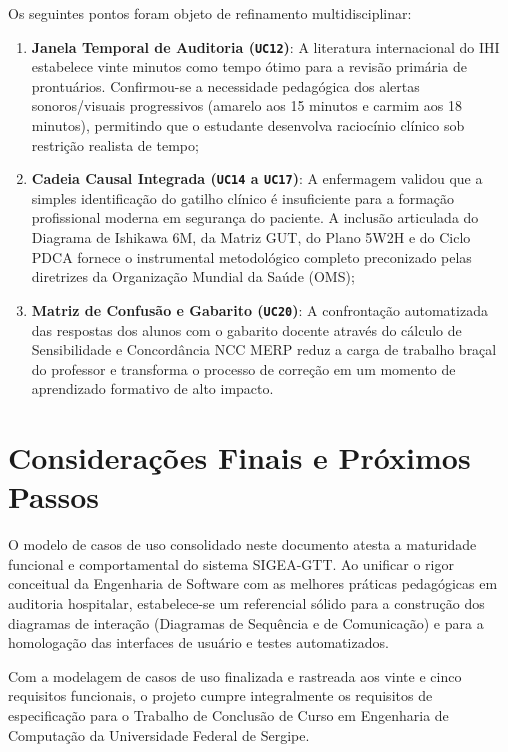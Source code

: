Os seguintes pontos foram objeto de refinamento multidisciplinar:
\begin{enumerate}
    \item \textbf{Janela Temporal de Auditoria (\texttt{UC12})}: A literatura internacional do IHI \cite{ihi2009} estabelece vinte minutos como tempo ótimo para a revisão primária de prontuários. Confirmou-se a necessidade pedagógica dos alertas sonoros/visuais progressivos (amarelo aos 15 minutos e carmim aos 18 minutos), permitindo que o estudante desenvolva raciocínio clínico sob restrição realista de tempo;
    \item \textbf{Cadeia Causal Integrada (\texttt{UC14} a \texttt{UC17})}: A enfermagem validou que a simples identificação do gatilho clínico é insuficiente para a formação profissional moderna em segurança do paciente. A inclusão articulada do Diagrama de Ishikawa 6M, da Matriz GUT, do Plano 5W2H e do Ciclo PDCA fornece o instrumental metodológico completo preconizado pelas diretrizes da Organização Mundial da Saúde (OMS);
    \item \textbf{Matriz de Confusão e Gabarito (\texttt{UC20})}: A confrontação automatizada das respostas dos alunos com o gabarito docente através do cálculo de Sensibilidade e Concordância NCC MERP reduz a carga de trabalho braçal do professor e transforma o processo de correção em um momento de aprendizado formativo de alto impacto.
\end{enumerate}

\section{Considerações Finais e Próximos Passos}
\label{sec_consideracoes_finais}

O modelo de casos de uso consolidado neste documento atesta a maturidade funcional e comportamental do sistema SIGEA-GTT. Ao unificar o rigor conceitual da Engenharia de Software com as melhores práticas pedagógicas em auditoria hospitalar, estabelece-se um referencial sólido para a construção dos diagramas de interação (Diagramas de Sequência e de Comunicação) e para a homologação das interfaces de usuário e testes automatizados.

Com a modelagem de casos de uso finalizada e rastreada aos vinte e cinco requisitos funcionais, o projeto cumpre integralmente os requisitos de especificação para o Trabalho de Conclusão de Curso em Engenharia de Computação da Universidade Federal de Sergipe.
